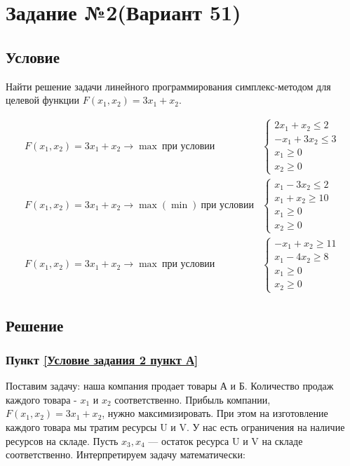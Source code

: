 \section{Задание №2(Вариант 51)}

\subsection{Условие}

Найти решение задачи линейного программирования симплекс-методом для целевой функции $F(x_1, x_2) = 3x_1 + x_2$.

\begin{align}
    F(x_1, x_2) = 3x_1 + x_2 \to \max\ \text{при условии} &
    \begin{cases}
        2x_1 + x_2 \leq 2\\
        -x_1 + 3x_2 \leq 3\\
        x_1 \geq 0\\
        x_2 \geq 0
    \end{cases}\tag{А}\label{Условие задания 2 пункт А}\\
    F(x_1, x_2) = 3x_1 + x_2 \to \max(\min)\ \text{при условии} &
    \begin{cases}
        x_1 - 3x_2 \leq 2 \\
        x_1 + x_2 \geq 10 \\
        x_1 \geq 0 \\
        x_2 \geq 0
    \end{cases}\tag{Б}\label{Условие задания 2 пункт Б}\\
    F(x_1, x_2) = 3x_1 + x_2 \to \max\ \text{при условии} &
    \begin{cases}
        -x_1 + x_2 \geq 11\\
        x_1 - 4x_2 \geq 8\\
        x_1 \geq 0\\
        x_2 \geq 0
    \end{cases}\tag{В}
    \label{Условие задания 2 пункт В}
\end{align}

\subsection{Решение}
\subsubsection{Пункт \ref{Условие задания 2 пункт А}}

Поставим задачу: наша компания продает товары А и Б. Количество продаж каждого товара - $x_1$ и $x_2$ соответственно.
Прибыль компании, $F(x_1, x_2) = 3x_1 + x_2$, нужно максимизировать. При этом на изготовление каждого товара мы тратим ресурсы U и V.
У нас есть ограничения на наличие ресурсов на складе. Пусть $x_3, x_4$ --- остаток ресурса U и V на складе соответственно.
Интерпретируем задачу математически:

